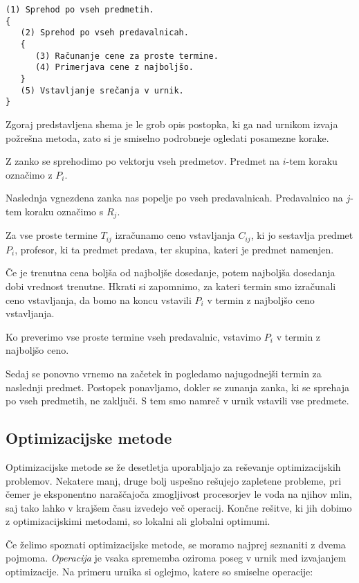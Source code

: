 \documentclass[a4paper,10pt]{article}
\begin{document}
\begin{verbatim}
(1) Sprehod po vseh predmetih.
{
   (2) Sprehod po vseh predavalnicah.
   {
      (3) Računanje cene za proste termine.
      (4) Primerjava cene z najboljšo.
   }
   (5) Vstavljanje srečanja v urnik.
}
\end{verbatim}

Zgoraj predstavljena shema je le grob opis postopka, ki ga nad urnikom izvaja požrešna metoda, zato si je smiselno podrobneje ogledati posamezne korake.

Z zanko se sprehodimo po vektorju vseh predmetov. Predmet na \(i\)-tem koraku označimo z \(P_i\).

Naslednja vgnezdena zanka nas popelje po vseh predavalnicah. Predavalnico na \(j\)-tem koraku označimo s \(R_j\).

Za vse proste termine \(T_{ij}\) izračunamo ceno vstavljanja \(C_{ij}\), ki jo sestavlja predmet \(P_i\), profesor, ki ta predmet predava, ter skupina, kateri je predmet namenjen.

Če je trenutna cena boljša od najboljše dosedanje, potem najboljša dosedanja dobi vrednost trenutne. Hkrati si zapomnimo, za kateri termin smo izračunali ceno vstavljanja, da bomo na koncu vstavili \(P_i\) v termin z najboljšo ceno vstavljanja.

Ko preverimo vse proste termine vseh predavalnic, vstavimo \(P_i\) v termin z najboljšo ceno.

Sedaj se ponovno vrnemo na začetek in pogledamo najugodnejši termin za naslednji predmet. Postopek ponavljamo, dokler se zunanja zanka, ki se sprehaja po vseh predmetih, ne zaključi. S tem smo namreč v urnik vstavili vse predmete.
\subsection{Optimizacijske metode}
Optimizacijske metode se že desetletja uporabljajo za reševanje optimizacijskih problemov. Nekatere manj, druge bolj uspešno rešujejo zapletene probleme, pri čemer je eksponentno naraščajoča zmogljivost procesorjev le voda na njihov mlin, saj tako lahko v krajšem času izvedejo več operacij. Končne rešitve, ki jih dobimo z optimizacijskimi metodami, so lokalni ali globalni optimumi.

Če želimo spoznati optimizacijske metode, se moramo najprej seznaniti z dvema pojmoma. \emph{Operacija} je vsaka sprememba oziroma poseg v urnik med izvajanjem optimizacije. Na primeru urnika si oglejmo, katere so smiselne operacije:
\end{document}
